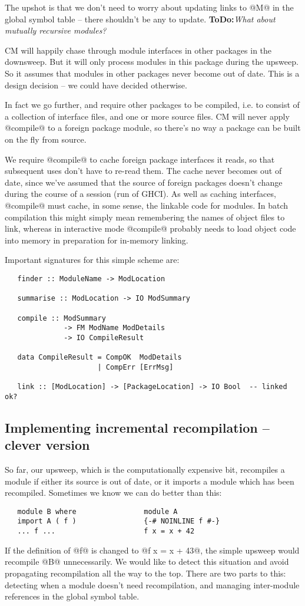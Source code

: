 \documentclass[11pt]{article}
\newcommand{\ToDo}[1]{{{\bf ToDo:}\sl #1}}
\begin{document}
The upshot is that we don't need to worry about updating links to @M@ in
the global symbol table -- there shouldn't be any to update.
\ToDo{What about mutually recursive modules?}

CM will happily chase through module interfaces in other packages in
the downsweep.  But it will only process modules in this package
during the upsweep.  So it assumes that modules in other packages
never become out of date.  This is a design decision -- we could have
decided otherwise.

In fact we go further, and require other packages to be compiled,
i.e. to consist of a collection of interface files, and one or more
source files.  CM will never apply @compile@ to a foreign package
module, so there's no way a package can be built on the fly from source.

We require @compile@ to cache foreign package interfaces it reads, so
that subsequent uses don't have to re-read them.  The cache never
becomes out of date, since we've assumed that the source of foreign
packages doesn't change during the course of a session (run of GHCI).
As well as caching interfaces, @compile@ must cache, in some sense,
the linkable code for modules.  In batch compilation this might simply
mean remembering the names of object files to link, whereas in
interactive mode @compile@ probably needs to load object code into
memory in preparation for in-memory linking.

Important signatures for this simple scheme are:
\begin{verbatim}
   finder :: ModuleName -> ModLocation

   summarise :: ModLocation -> IO ModSummary

   compile :: ModSummary 
              -> FM ModName ModDetails
              -> IO CompileResult

   data CompileResult = CompOK  ModDetails
                      | CompErr [ErrMsg]

   link :: [ModLocation] -> [PackageLocation] -> IO Bool  -- linked ok?
\end{verbatim}


\subsection{Implementing incremental recompilation -- clever version}

So far, our upsweep, which is the computationally expensive bit,
recompiles a module if either its source is out of date, or it 
imports a module which has been recompiled.  Sometimes we know
we can do better than this:
\begin{verbatim}
   module B where                module A 
   import A ( f )                {-# NOINLINE f #-}
   ... f ...                     f x = x + 42
\end{verbatim}
If the definition of @f@ is changed to @f x = x + 43@, the simple
upsweep would recompile @B@ unnecessarily.  We would like to detect
this situation and avoid propagating recompilation all the way to the
top.  There are two parts to this: detecting when a module doesn't
need recompilation, and managing inter-module references in the
global symbol table.
\end{document}

